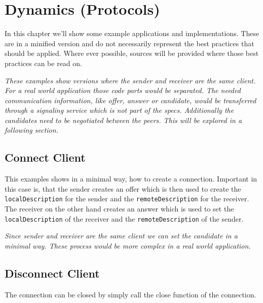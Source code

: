 \section{Dynamics (Protocols)}
In this chapter we'll show some example applications and implementations. These are in a minified version and do not necessarily represent the best practices that should be applied. Where ever possible, sources will be provided where those best practices can be read on.

\textit{These examples show versions where the sender and receiver are the same client. For a real world application those code parts would be separated. The needed communication information, like offer, answer or  candidate, would be transferred through a signaling service which is not part of the  specs. Additionally the  candidates need to be negotiated between the peers. This will be explored in a following section.}

\subsection{Connect Client}
This examples shows in a minimal way, how to create a  connection. Important in this case is, that the sender creates an offer which is then used to create the \lstinline[basicstyle=\ttfamily\color{black}]|localDescription| for the sender and the \lstinline[basicstyle=\ttfamily\color{black}]|remoteDescription| for the receiver. The receiver on the other hand creates an answer which is used to set the \lstinline[basicstyle=\ttfamily\color{black}]|localDescription| of the receiver and the \lstinline[basicstyle=\ttfamily\color{black}]|remoteDescription| of the sender.

\textit{Since sender and receiver are the same client we can set the  candidate in a minimal way. These process would be more complex in a real world application.}


\subsection{Disconnect Client}
The connection can be closed by simply call the close function of the  connection.


